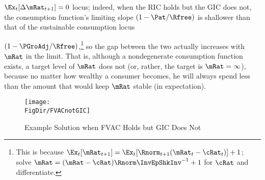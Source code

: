 \documentclass[titlepage]{\econtex}\providecommand{\texname}{BufferStockTheory}%
\providecommand{\FigDir}{Figures}
\renewcommand{\FigDir}{Code/Python/Figures}
\begin{document}
$\Ex_{t}[\Delta \mRat_{t+1}]=0$ locus; indeed, when the RIC holds but
the GIC does not, the consumption function's limiting slope
$(1-\Pat/\Rfree)$ is shallower than that of the sustainable consumption
locus {$(1-\PGroAdj/\Rfree)$,\footnote{This is because
    $\Ex_{t}[\mRat_{t+1}]=\Ex_{t}[\Rnorm_{t+1}(\mRat_{t}-\cRat_{t})]+1$; solve $\mRat = (\mRat - \cRat)\Rnorm \InvEpShkInv^{-1}+1$ for $\cRat$ and differentiate.}
  so the gap between the two actually increases with $\mRat$ in the
  limit.  That is, although a nondegenerate consumption function
  exists, a target level of $\mRat$ does not (or, rather, the
  target is $\mRat=\infty$), because no matter how wealthy a consumer
  becomes, he will always spend less than the amount that
  would keep $\mRat$ stable (in expectation).


\begin{figure}[tbp]
\centerline{\texttt{[image: \\FigDir/FVACnotGIC]}}
\caption{Example Solution when FVAC Holds but GIC Does Not}
\label{fig:FVACnotGIC}
\end{figure}

\begin{comment}
The foregoing has some connection with the theoretical results in
Szeidl~\citeyearpar{szeidlInvariant}, who shows that the condition we
call the GIC guarantees that $\mRat$ will have an asymptotically
bounded mean.  He also shows that under these circumstances $\mRat$
satisfies conditions he proves to be necessary for the existence of a
stable invariant distribution.  Furthermore, $\aRat$, $\bRat$, and $\cRat$
are also shown to have stable invariant distributions and asymptotically
bounded means.  We make use of these results below.
\end{comment}

\begin{comment} %
A final point worth reemphasizing is that neither the Return
Impatience Condition nor the Finite Human Wealth Condition was
required for the contraction mapping proof.  Both these conditions are
necessary for a nondegenerate solution to exist in the unconstrained
perfect foresight case.  This is noteworthy because in some models and
in many economists' intuition, the introduction of uncertainty reduces
the space of parameter values for which a unique solution exists;
here, precisely the opposite occurs.  Indeed, many of the
parameterizations newly eligible for solution are quite plausible, so
this observation is not merely a curiosum but of real practical
value.\footnote{An easy example of a case where the perfect foresight
  model has no solution is where $\Rfree >1$, $\Discount = 1/\Rfree$
  and $\PGro > \Rfree$.}
\end{comment}

}
\end{document}
